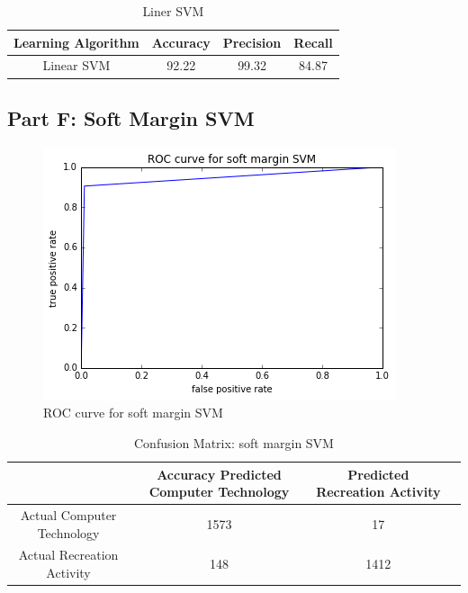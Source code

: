 \documentclass[11pt]{article}
\begin{document}
\begin{table}[h]
	\centering
	\begin{tabular}{|c|c|c|c|} \hline
		Learning Algorithm & Accuracy & Precision & Recall\\ \hline
		Linear SVM & 92.22 & 99.32 & 84.87 \\
		\hline
	\end{tabular}
	\caption{Liner SVM}
	\label{table:ovr_res}
\end{table}

\subsection{Part F: Soft Margin SVM}

\begin{figure}[h]
	
	\includegraphics[width=\textwidth]{ROC_SMSVM.png}
	\caption{ROC curve for soft margin SVM}
\end{figure}

\begin{table}[h]
	\centering
	\begin{tabular}{|c|c|c|c|} \hline
		& Accuracy 		Predicted Computer Technology & Predicted Recreation Activity \\ \hline
		Actual Computer Technology & 1573 & 17 \\
		Actual Recreation Activity & 148& 1412  \\
		\hline
	\end{tabular}
	\caption{Confusion Matrix: soft margin SVM}
	\label{table:ovr_res}
\end{table}
\end{document}
